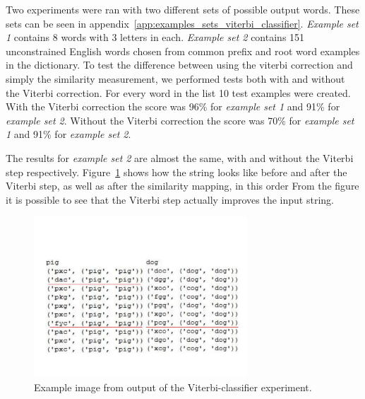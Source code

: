  Two experiments were ran with two different sets of possible output words.
 These sets can be seen in appendix~\ref{app:examples_sets_viterbi_classifier}.
 \emph{Example set 1} contains 8 words with 3 letters in each.
 \emph{Example set 2} contains 151 unconstrained English words chosen from common prefix and root word examples in the dictionary.
 To test the difference between using the viterbi correction and simply the similarity measurement, we performed tests both with and without the Viterbi correction.
 For every word in the list 10 test examples were created.
 With the Viterbi correction the score was 96\% for \emph{example set 1} and 91\% for \emph{example set 2}.
 Without the Viterbi correction the score was 70\% for \emph{example set 1} and 91\% for \emph{example set 2}.

 The results for \emph{example set 2} are almost the same, with and without the Viterbi step respectively.
Figure~\ref{fig:viterbifig} shows how the string looks like before and after the Viterbi step, as well as after the similarity mapping, in this order
 From the figure it is possible to see that the Viterbi step actually improves the input string.

    \begin{figure}[htb] 
      \begin{center}
	\leavevmode
	\includegraphics[width=80mm]{viterbiimage.pdf}%
      \end{center}
      \caption{Example image from output of the Viterbi-classifier experiment.}
      \label{fig:viterbifig}
    \end{figure}






